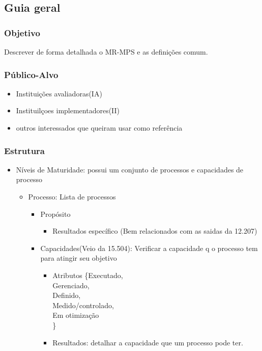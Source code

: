 \documentclass{article}
\begin{document}
\subsection{Guia geral} \date{31 de Março de 2014}

\subsubsection{Objetivo} Descrever de forma detalhada o MR-MPS e as definições comum.
\subsubsection{Público-Alvo} 
	\begin{itemize}
		\item Instituições avaliadoras(IA)
		\item Instituilçoes implementadores(II)
		\item outros interessados que queiram usar como referência
	\end{itemize} 
\subsubsection{Estrutura}

	\begin{itemize}
	\item Níveis de Maturidade: possui um conjunto de processos e capacidades de processo
		\begin{itemize}
		\item Processo: Lista de processos
			\begin{itemize}
			\item Propósito
				\begin{itemize}
				\item Resultados específico (Bem relacionados com as saidas da 12.207)
				\end{itemize}
			\item Capacidades(Veio da 15.504): Verificar a capacidade q o processo tem para atingir seu objetivo	
				\begin{itemize}
				\item Atributos \{Executado,\\ Gerenciado,\\ Definido,\\ Medido/controlado, \\Em otimização\\ \}
				\item Resultados: detalhar a capacidade que um processo pode ter.
				\end{itemize}					 
			\end{itemize}
		\end{itemize}			 
	\end{itemize}
\end{document}
